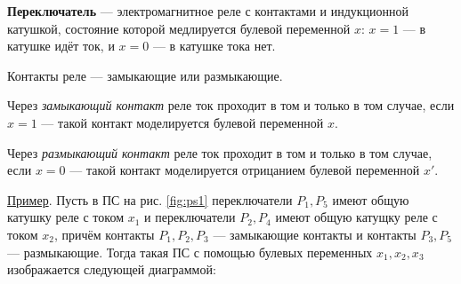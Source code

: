 \dftion \textbf{Переключатель} --- электромагнитное реле с контактами и индукционной катушкой, состояние которой медлируется булевой переменной $x$: $x = 1$ --- в катушке идёт ток, и $x = 0$ --- в катушке тока нет.

Контакты реле --- замыкающие или размыкающие.

Через \textit{замыкающий контакт} реле ток проходит в том и только в том случае, если $x = 1$ --- такой контакт моделируется булевой переменной $x$.

Через \textit{размыкающий контакт} реле ток проходит в том и только в том случае, если $x = 0$ --- такой контакт моделируется отрицанием булевой переменной $x'$.

\underline{Пример}. Пусть в ПС на рис. \ref{fig:ps1} переключатели $P_1, P_5$ имеют общую катушку реле с током $x_1$ и переключатели $P_2, P_4$ имеют общую катущку реле с током $x_2$, причём контакты $P_1, P_2, P_3$ --- замыкающие контакты и контакты $P_3, P_5$ --- размыкающие. Тогда такая ПС с помощью булевых переменных $x_1, x_2, x_3$ изображается следующей диаграммой:

